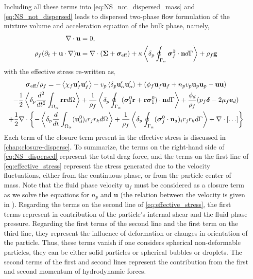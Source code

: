 Including all these terms into \ref{eq:NS_not_dispersed_mass} and \ref{eq:NS_not_dispersed} leads to dispersed two-phase flow formulation of the mixture volume and acceleration equation of the bulk phase, namely, 
\begin{align}
    \div\textbf{u}&=0, \\
    \rho_f (\pddt 
    + \textbf{u}\cdot \grad)
    \textbf{u}
    &= 
    \div (\bm\Sigma +  \bm{\sigma}_\text{eff} )
    + \kappa \pSavg{ \bm{\sigma}_f^0 \cdot \textbf{n}} 
    + \rho_f\textbf{g} 
    \label{eq:NS_dispersed}
\end{align}
with the effective stress re-written as, 
\begin{multline}
    \bm\sigma_\text{eff}/\rho_f = 
    - \avg{ \chi_f \textbf{u}_f'\textbf{u}_f'}
    - v_p \pavg{ \textbf{u}_\alpha'\textbf{u}_\alpha'}
    + (\phi_f \textbf{u}_f \textbf{u}_f
        +n_pv_p\textbf{u}_p \textbf{u}_p
        - \textbf{uu} 
    )\\
    -\frac{1}{2}\pavg{\frac{d^2 }{dt^2}\intO{\textbf{rr}}}
    +\frac{1}{\rho_f}\pSavg{ 
        (\bm{\sigma}_1^0 \textbf{r}
        + \textbf{r}\bm{\sigma}_1^0 )
        \cdot \textbf{n}
    }
    + \frac{\phi_d}{\rho_f} (p_f\bm\delta -2\mu_f \textbf{e}_d)
    \\
    +\frac{1}{2}\div\left\{
    - \pavg{\ddt\intO{  (\textbf{u}_d^0)_i r_j r_k }}
    +\frac{1}{\rho_f}\pSavg{  (\bm{\sigma}_f^0 \cdot \textbf{n}_d)_i r_{j}  r_{k}  } 
    + \div[\ldots]
    \right\}
    \label{eq:effective_stress}
\end{multline}
Each term of the closure term present in the effective stress is discussed in \ref{chap:closure-disperse}.
To summarize, the terms on the right-hand side of \ref{eq:NS_dispersed} represent the total drag force, and the terms on the first line of \ref{eq:effective_stress} represent the stress generated due to the velocity fluctuations, either from the continuous phase, or from the particle center of mass. 
Note that the fluid phase velocity $\textbf{u}_f$ must be considered as a closure term as we solve the equations for $n_p$ and  $\textbf{u}$ (the relation between the velocity is given in \citet{zaepffel2012multisize}).
Regarding the terms on the second line of \ref{eq:effective_stress}, the first terms represent in contribution of the particle's internal shear and the fluid phase pressure.
Regarding the first terms of the second line and the first term on the third line, they represent the influence of deformation or changes in orientation of the particle. 
Thus, these terms vanish if one considers spherical non-deformable particles, they can be either solid particles or spherical bubbles or droplets. 
The second terms of the first and second lines represent the contribution from the first and second momentum of hydrodynamic forces. 


